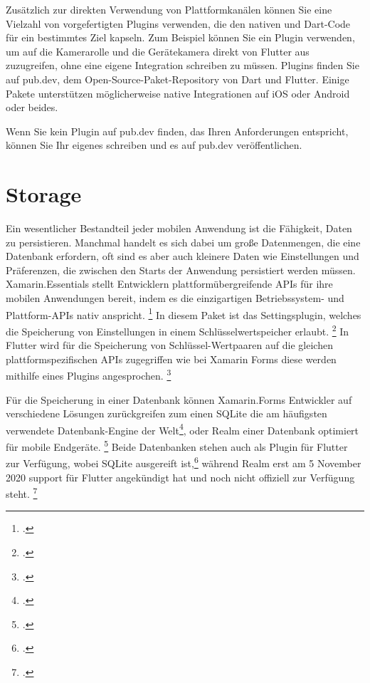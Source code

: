 Zusätzlich zur direkten Verwendung von Plattformkanälen können Sie eine Vielzahl von vorgefertigten Plugins verwenden, die den nativen und Dart-Code für ein bestimmtes Ziel kapseln. Zum Beispiel können Sie ein Plugin verwenden, um auf die Kamerarolle und die Gerätekamera direkt von Flutter aus zuzugreifen, ohne eine eigene Integration schreiben zu müssen. Plugins finden Sie auf pub.dev, dem Open-Source-Paket-Repository von Dart und Flutter. Einige Pakete unterstützen möglicherweise native Integrationen auf iOS oder Android oder beides.

Wenn Sie kein Plugin auf pub.dev finden, das Ihren Anforderungen entspricht, können Sie Ihr eigenes schreiben und es auf pub.dev veröffentlichen.


\section{Storage}
Ein wesentlicher Bestandteil jeder mobilen Anwendung ist die Fähigkeit,  Daten zu persistieren.  Manchmal handelt es sich dabei um große Datenmengen,  die eine Datenbank erfordern,  oft sind es aber auch kleinere Daten wie Einstellungen und Präferenzen, die zwischen den Starts der Anwendung persistiert werden müssen.   
Xamarin.Essentials stellt Entwicklern plattformübergreifende APIs für ihre mobilen Anwendungen bereit,  indem es die einzigartigen Betriebssystem- und Plattform-APIs nativ anspricht. \footcite[Vgl.][Abgerufen am \today]{MicrosoftXamEssentials2020} In diesem Paket ist das Settingsplugin, welches die Speicherung von Einstellungen in einem Schlüsselwertspeicher erlaubt.  \footcite[Vgl.][Abgerufen am \today]{MicrosoftXamSettings2019} In Flutter wird für die Speicherung von Schlüssel-Wertpaaren auf die gleichen plattformspezifischen APIs zugegriffen wie bei Xamarin Forms diese werden mithilfe eines Plugins angesprochen.  \footcite[Vgl.][Abgerufen am \today]{GoogleFlutterSharedPreferences2020} 

Für die Speicherung in einer Datenbank können Xamarin.Forms Entwickler auf verschiedene Lösungen zurückgreifen zum einen SQLite  die am häufigsten verwendete Datenbank-Engine der Welt\footcite[Vgl.][Abgerufen am \today]{SQLiteConsortium2020},  oder Realm einer Datenbank optimiert für mobile Endgeräte. \footcite[Vgl.][Abgerufen am \today]{MongoDBRealm2020} Beide Datenbanken stehen auch als Plugin für Flutter zur Verfügung, wobei SQLite ausgereift ist,\footcite[Vgl.][Abgerufen am \today]{Tekartik2020} während Realm erst am 5 November 2020 support für Flutter angekündigt hat und noch nicht offiziell zur Verfügung steht. \footcite[Vgl.][Abgerufen am \today]{MongoDBFlutterSupport2020}
